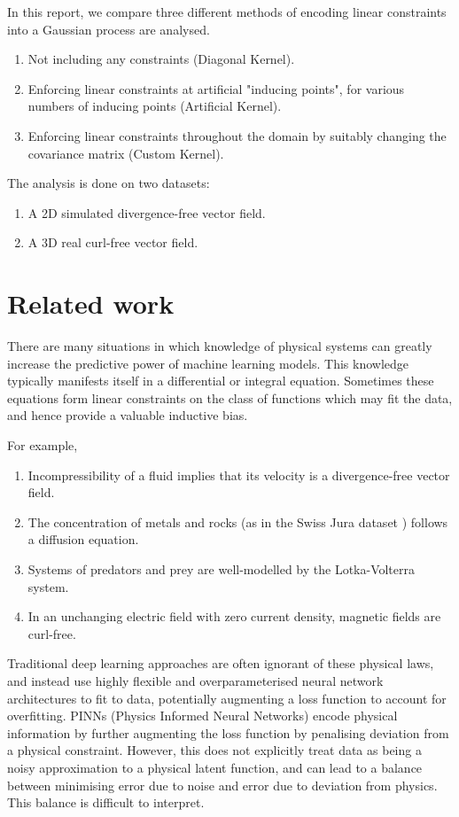 \documentclass[12pt,a4paper,twoside]{report}
\theoremstyle{definition}
\begin{document}
In this report, we compare three different methods of encoding linear constraints into a Gaussian process are analysed.

\begin{enumerate}
	\item Not including any constraints (Diagonal Kernel).
	\item Enforcing linear constraints at artificial "inducing points", for various numbers of inducing points (Artificial Kernel).
	\item Enforcing linear constraints throughout the domain by suitably changing the covariance matrix (Custom Kernel).
\end{enumerate}

The analysis is done on two datasets:
\begin{enumerate}
	\item A 2D simulated divergence-free vector field.
	\item A 3D real curl-free vector field.
\end{enumerate}

\chapter{Related work}
There are many situations in which knowledge of physical systems can greatly increase the predictive power of machine learning models. This knowledge typically manifests itself in a differential or integral equation. Sometimes these equations form linear constraints on the class of functions which may fit the data, and hence provide a valuable inductive bias.

For example,
\begin{enumerate}
	\item Incompressibility of a fluid implies that its velocity is a divergence-free vector field. 
	\item The concentration of metals and rocks (as in the Swiss Jura dataset \cite{Swan}) follows a diffusion equation. 
	\item Systems of predators and prey are well-modelled by the Lotka-Volterra system. 
	\item In an unchanging electric field with zero current density, magnetic fields are curl-free.
\end{enumerate}

Traditional deep learning approaches are often ignorant of these physical laws, and instead use highly flexible and overparameterised neural network architectures to fit to data, potentially augmenting a loss function to account for overfitting. 
PINNs (Physics Informed Neural Networks) \cite{Raissi} encode physical information by further augmenting the loss function by penalising deviation from a physical constraint. However, this does not explicitly treat data as being a noisy approximation to a physical latent function, and can lead to a balance between minimising error due to noise and error due to deviation from physics. This balance is difficult to interpret.
\end{document}
